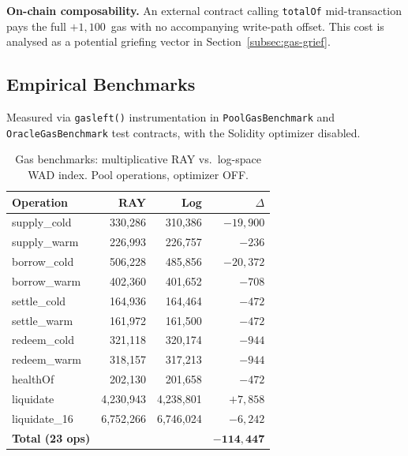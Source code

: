 \documentclass[10pt,a4paper,twocolumn]{article}
\begin{document}
\textbf{On-chain composability.} An external contract calling \texttt{totalOf} mid-transaction pays the full $+1{,}100$~gas with no accompanying write-path offset. This cost is analysed as a potential griefing vector in Section~\ref{subsec:gas-grief}.

\subsection{Empirical Benchmarks}
\label{subsec:gas-bench}

Measured via \texttt{gasleft()} instrumentation in \texttt{PoolGasBenchmark} and \texttt{OracleGasBenchmark} test contracts, with the Solidity optimizer disabled.

\begin{table}[htbp]
\centering
\caption{Gas benchmarks: multiplicative RAY vs.\ log-space WAD index. Pool operations, optimizer OFF.}
\label{tab:gas-pool}
\small
\begin{tabular*}{0.95\columnwidth}{@{\extracolsep{\fill}}lrrr@{}}
\toprule
Operation & RAY & Log & $\Delta$ \\
\midrule
supply\_cold & 330,286 & 310,386 & $-19{,}900$ \\
supply\_warm & 226,993 & 226,757 & $-236$ \\
borrow\_cold & 506,228 & 485,856 & $-20{,}372$ \\
borrow\_warm & 402,360 & 401,652 & $-708$ \\
settle\_cold & 164,936 & 164,464 & $-472$ \\
settle\_warm & 161,972 & 161,500 & $-472$ \\
redeem\_cold & 321,118 & 320,174 & $-944$ \\
redeem\_warm & 318,157 & 317,213 & $-944$ \\
healthOf & 202,130 & 201,658 & $-472$ \\
liquidate & 4,230,943 & 4,238,801 & $+7{,}858$ \\
liquidate\_16 & 6,752,266 & 6,746,024 & $-6{,}242$ \\
\midrule
\textbf{Total (23 ops)} & & & $\mathbf{-114{,}447}$ \\
\bottomrule
\end{tabular*}
\end{table}
\end{document}
